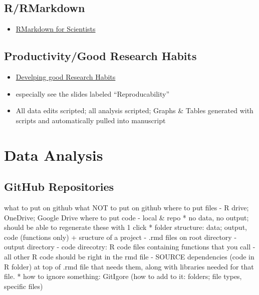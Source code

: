\documentclass[
]{book}
\providecommand{\tightlist}{%
  \setlength{\itemsep}{0pt}\setlength{\parskip}{0pt}}
\begin{document}
\hypertarget{rrmarkdown}{%
\section{R/RMarkdown}\label{rrmarkdown}}

\begin{itemize}
\tightlist
\item
  \href{https://rmd4sci.njtierney.com/}{RMarkdown for Scientists}
\end{itemize}

\hypertarget{productivitygood-research-habits}{%
\section{Productivity/Good Research Habits}\label{productivitygood-research-habits}}

\begin{itemize}
\tightlist
\item
  \href{file:///C:/Users/bohil/Downloads/ResearchHabits.pdf}{Develping good Research Habits}
\item
  especially see the slides labeled ``Reproducability''
\item
  All data edits scripted; all analysis scripted; Graphs \& Tables generated with scripts and automatically pulled into manuscript
\end{itemize}

\hypertarget{intro}{%
\chapter{Data Analysis}\label{intro}}

\hypertarget{github-repositories}{%
\section{GitHub Repositories}\label{github-repositories}}

what to put on github
what NOT to put on github
where to put files - R drive; OneDrive; Google Drive
where to put code - local \& repo
* no data, no output; should be able to regenerate these with 1 click
* folder structure: data; output, code (functions only)
+ sructure of a project
- .rmd files on root directory
- output directory
- code direcotry: R code files containing functions that you call
- all other R code should be right in the rmd file
- SOURCE dependencies (code in R folder) at top of .rmd file that needs them, along with libraries needed for that file.
* how to ignore something: GitIgore (how to add to it: folders; file types, specific files)
\end{document}
